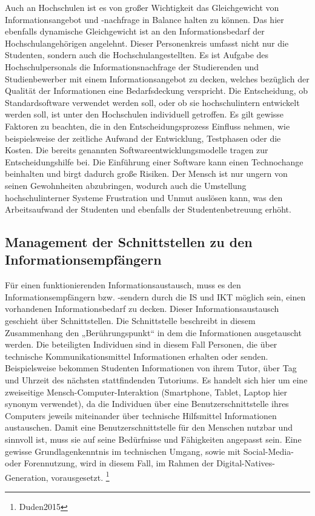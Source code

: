 Auch an Hochschulen ist es von großer Wichtigkeit das Gleichgewicht von Informationsangebot und -nachfrage in Balance halten zu können. Das hier ebenfalls dynamische Gleichgewicht ist an den Informationsbedarf der Hochschulangehörigen angelehnt. Dieser Personenkreis umfasst nicht nur die Studenten, sondern auch die Hochschulangestellten. Es ist Aufgabe des Hochschulpersonals die Informationsnachfrage der Studierenden und Studienbewerber mit einem Informationsangebot zu decken, welches bezüglich der Qualität der Informationen eine Bedarfsdeckung verspricht. Die Entscheidung, ob Standardsoftware verwendet werden soll, oder ob sie hochschulintern entwickelt werden soll, ist unter den Hochschulen individuell getroffen. Es gilt gewisse Faktoren zu beachten, die in den Entscheidungsprozess Einfluss nehmen, wie beispielsweise der zeitliche Aufwand der Entwicklung, Testphasen oder die Kosten. Die bereits genannten Softwareentwicklungsmodelle tragen zur Entscheidungshilfe bei.
Die Einführung einer Software kann einen Technochange beinhalten und birgt dadurch große Risiken. Der Mensch ist nur ungern von seinen Gewohnheiten abzubringen, wodurch auch die Umstellung hochschulinterner Systeme Frustration und Unmut auslösen kann, was den Arbeitsaufwand der Studenten und  ebenfalls der Studentenbetreuung erhöht.  


\subsection{Management der Schnittstellen zu den Informationsempfängern}
Für einen funktionierenden Informationsaustausch, muss es den Informationsempfängern bzw. -sendern durch die IS und IKT möglich sein, einen vorhandenen Informationsbedarf zu decken. Dieser Informationsaustausch geschieht über Schnittstellen.
Die Schnittstelle beschreibt in diesem Zusammenhang den „Berührungspunkt“ in dem die Informationen ausgetauscht werden. Die beteiligten Individuen sind in diesem Fall Personen, die über technische Kommunikationsmittel Informationen erhalten oder senden. Beispielsweise bekommen Studenten Informationen von ihrem Tutor, über Tag und Uhrzeit des nächsten stattfindenden Tutoriums. 
Es handelt sich hier um eine zweiseitige Mensch-Computer-Interaktion (Smartphone, Tablet, Laptop hier synonym verwendet), da die Individuen über eine Benutzerschnittstelle ihres Computers jeweils miteinander über technische Hilfsmittel Informationen austauschen. Damit eine Benutzerschnittstelle für den Menschen nutzbar und sinnvoll ist, muss sie auf seine Bedürfnisse und Fähigkeiten angepasst sein. Eine gewisse Grundlagenkenntnis im technischen Umgang, sowie mit Social-Media- oder Forennutzung, wird in diesem Fall, im Rahmen der Digital-Natives-Generation, vorausgesetzt. \footnote{Duden2015}

